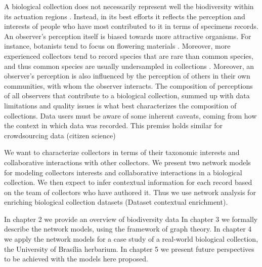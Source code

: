 A biological collection does not necessarily represent well the biodiversity within its actuation regions \cite{Funk1999}.
Instead, in its best efforts it reflects the perception and interests of people who have most contributed to it in terms of specimens records.
An observer's perception itself is biased towards more attractive organisms. 
For instance, botanists tend to focus on flowering materials \cite{VanGemerden2005}.
Moreover, more experienced collectors tend to record species that are rare than common species, and thus common species are usually undersampled in collections \cite{Nelson1990}.
Moreover, an observer's perception is also influenced by the perception of others in their own communities, with whom the observer interacts. 
The composition of perceptions of all observers that contribute to a biological collection, summed up with data limitations and quality issues is what best characterizes the composition of collections.
Data users must be aware of some inherent caveats, coming from how the context in which data was recorded. 
This premiss holds similar for crowdsourcing data (citizen science)


We want to characterize collectors in terms of their taxonomic interests and collaborative interactions with other collectors.
We present two network models for modeling collectors interests and collaborative interactions in a biological collection.
We then expect to infer contextual information for each record based on the team of collectors who have authored it.
Thus we use network analysis for enriching biological collection datasets (Dataset contextual enrichment).


In chapter 2 we provide an overview of biodiversity data
In chapter 3 we formally describe the network models, using the framework of graph theory.
In chapter 4 we apply the network models for a case study of a real-world biological collection, the University of Brasília herbarium.
In chapter 5 we present future perspectives to be achieved with the models here proposed.




